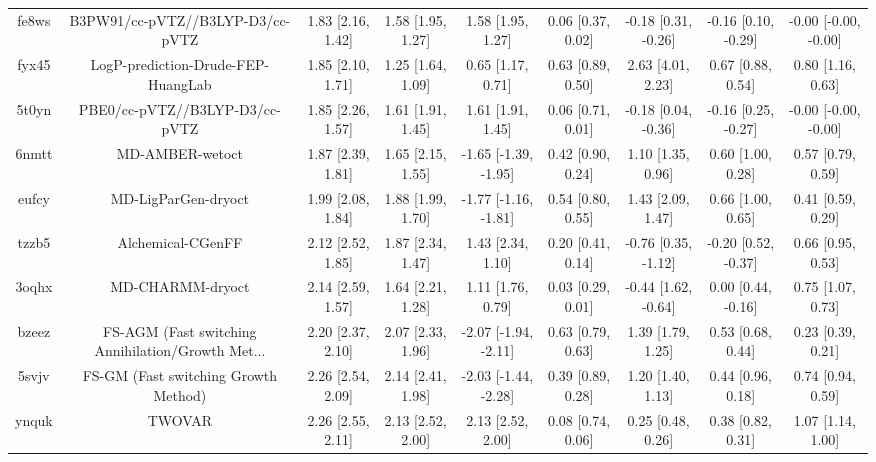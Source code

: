 \documentclass{article}
\begin{document}
\begin{center}
\begin{longtable}{|ccccccccc|}
 fe8ws &                   B3PW91/cc-pVTZ//B3LYP-D3/cc-pVTZ &  1.83 [2.16, 1.42] &  1.58 [1.95, 1.27] &     1.58 [1.95, 1.27] &  0.06 [0.37, 0.02] &   -0.18 [0.31, -0.26] &   -0.16 [0.10, -0.29] &  -0.00 [-0.00, -0.00] \\
 fyx45 &                 LogP-prediction-Drude-FEP-HuangLab &  1.85 [2.10, 1.71] &  1.25 [1.64, 1.09] &     0.65 [1.17, 0.71] &  0.63 [0.89, 0.50] &     2.63 [4.01, 2.23] &     0.67 [0.88, 0.54] &     0.80 [1.16, 0.63] \\
 5t0yn &                     PBE0/cc-pVTZ//B3LYP-D3/cc-pVTZ &  1.85 [2.26, 1.57] &  1.61 [1.91, 1.45] &     1.61 [1.91, 1.45] &  0.06 [0.71, 0.01] &   -0.18 [0.04, -0.36] &   -0.16 [0.25, -0.27] &  -0.00 [-0.00, -0.00] \\
 6nmtt &                                    MD-AMBER-wetoct &  1.87 [2.39, 1.81] &  1.65 [2.15, 1.55] &  -1.65 [-1.39, -1.95] &  0.42 [0.90, 0.24] &     1.10 [1.35, 0.96] &     0.60 [1.00, 0.28] &     0.57 [0.79, 0.59] \\
 eufcy &                                MD-LigParGen-dryoct &  1.99 [2.08, 1.84] &  1.88 [1.99, 1.70] &  -1.77 [-1.16, -1.81] &  0.54 [0.80, 0.55] &     1.43 [2.09, 1.47] &     0.66 [1.00, 0.65] &     0.41 [0.59, 0.29] \\
 tzzb5 &                                  Alchemical-CGenFF &  2.12 [2.52, 1.85] &  1.87 [2.34, 1.47] &     1.43 [2.34, 1.10] &  0.20 [0.41, 0.14] &   -0.76 [0.35, -1.12] &   -0.20 [0.52, -0.37] &     0.66 [0.95, 0.53] \\
 3oqhx &                                   MD-CHARMM-dryoct &  2.14 [2.59, 1.57] &  1.64 [2.21, 1.28] &     1.11 [1.76, 0.79] &  0.03 [0.29, 0.01] &   -0.44 [1.62, -0.64] &    0.00 [0.44, -0.16] &     0.75 [1.07, 0.73] \\
 bzeez &  FS-AGM (Fast switching Annihilation/Growth Met... &  2.20 [2.37, 2.10] &  2.07 [2.33, 1.96] &  -2.07 [-1.94, -2.11] &  0.63 [0.79, 0.63] &     1.39 [1.79, 1.25] &     0.53 [0.68, 0.44] &     0.23 [0.39, 0.21] \\
 5svjv &               FS-GM (Fast switching Growth Method) &  2.26 [2.54, 2.09] &  2.14 [2.41, 1.98] &  -2.03 [-1.44, -2.28] &  0.39 [0.89, 0.28] &     1.20 [1.40, 1.13] &     0.44 [0.96, 0.18] &     0.74 [0.94, 0.59] \\
 ynquk &                                             TWOVAR &  2.26 [2.55, 2.11] &  2.13 [2.52, 2.00] &     2.13 [2.52, 2.00] &  0.08 [0.74, 0.06] &     0.25 [0.48, 0.26] &     0.38 [0.82, 0.31] &     1.07 [1.14, 1.00] \\

\end{longtable}
\end{center}
\end{document}
